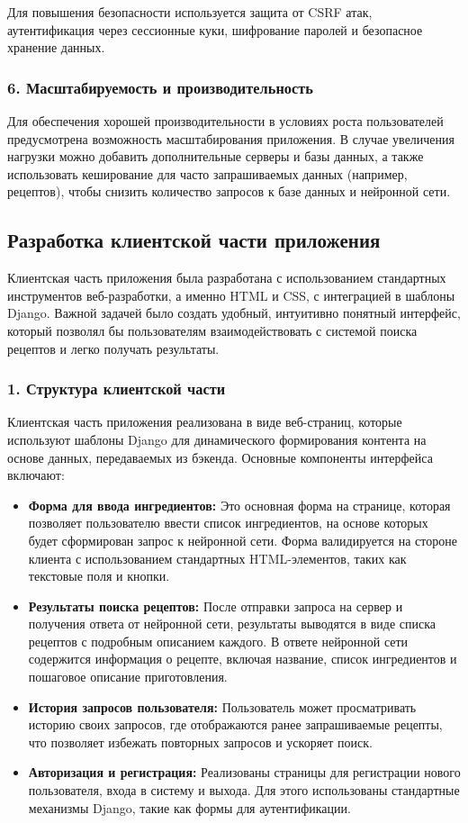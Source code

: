 {Для повышения безопасности используется защита от CSRF атак, аутентификация через сессионные куки, шифрование паролей и безопасное хранение данных.

\subsubsection*{6. Масштабируемость и производительность}
Для обеспечения хорошей производительности в условиях роста пользователей предусмотрена возможность масштабирования приложения. В случае увеличения нагрузки можно добавить дополнительные серверы и базы данных, а также использовать кеширование для часто запрашиваемых данных (например, рецептов), чтобы снизить количество запросов к базе данных и нейронной сети.

\newpage

\subsection{Разработка клиентской части приложения}
{
    Клиентская часть приложения была разработана с использованием стандартных инструментов веб-разработки, а именно HTML и CSS, с интеграцией в шаблоны Django. Важной задачей было создать удобный, интуитивно понятный интерфейс, который позволял бы пользователям взаимодействовать с системой поиска рецептов и легко получать результаты.

    \subsubsection*{1. Структура клиентской части}
    
    Клиентская часть приложения реализована в виде веб-страниц, которые используют шаблоны Django для динамического формирования контента на основе данных, передаваемых из бэкенда. Основные компоненты интерфейса включают:
    
    \begin{itemize}
        \item \textbf{Форма для ввода ингредиентов:} Это основная форма на странице, которая позволяет пользователю ввести список ингредиентов, на основе которых будет сформирован запрос к нейронной сети. Форма валидируется на стороне клиента с использованием стандартных HTML-элементов, таких как текстовые поля и кнопки.
        \item \textbf{Результаты поиска рецептов:} После отправки запроса на сервер и получения ответа от нейронной сети, результаты выводятся в виде списка рецептов с подробным описанием каждого. В ответе нейронной сети содержится информация о рецепте, включая название, список ингредиентов и пошаговое описание приготовления.
        \item \textbf{История запросов пользователя:} Пользователь может просматривать историю своих запросов, где отображаются ранее запрашиваемые рецепты, что позволяет избежать повторных запросов и ускоряет поиск.
        \item \textbf{Авторизация и регистрация:} Реализованы страницы для регистрации нового пользователя, входа в систему и выхода. Для этого использованы стандартные механизмы Django, такие как формы для аутентификации.
    \end{itemize}
    
}}
